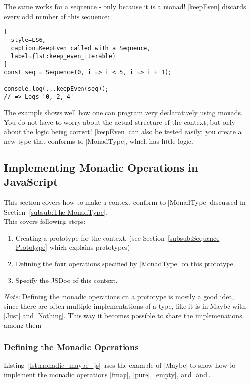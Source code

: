 The same works for a sequence - only because it is a monad! |keepEven| discards
every odd number of this sequence:

\begin{lstlisting}[
  style=ES6,
  caption=KeepEven called with a Sequence,
  label={lst:keep_even_iterable}
]
const seq = Sequence(0, i => i < 5, i => i + 1);

console.log(...keepEven(seq));
// => Logs '0, 2, 4'
\end{lstlisting}
The example shows well how one can program very declaratively using monads. You
do not have to worry about the actual structure of the context, but only about
the logic being correct!
|keepEven| can also be tested easily: you create a new type that conforms to
|MonadType|, which has little logic.


\subsection{Implementing Monadic Operations in JavaScript} %
\label{sub:Implementing Monadic Operations in JavaScript}
This section covers how to make a context conform to |MonadType| discussed in
Section~\ref{subsub:The MonadType}.\\ 
This covers following steps:
\begin{enumerate}
  \item Creating a prototype for the context. (see Section~\ref{subsub:Sequence
    Prototype} which explains prototypes)
  \item Defining the four operations specified by |MonadType| on this
    prototype.
  \item Specify the JSDoc of this context.
\end{enumerate}

\textit{Note:} Defining the monadic operations on a prototype is mostly a good
idea, since there are often multiple implementations of a type, like it is in
Maybe with |Just| and |Nothing|. This way it becomes possible to share the
implemenations among them.

\subsubsection{Defining the Monadic Operations} %
\label{subsub:Defining the Monadic Operations}
Listing~\ref{lst:monadic_maybe_js} uses the example of |Maybe| to show how to
implement the monadic operations |fmap|, |pure|, |empty|, and |and|.

